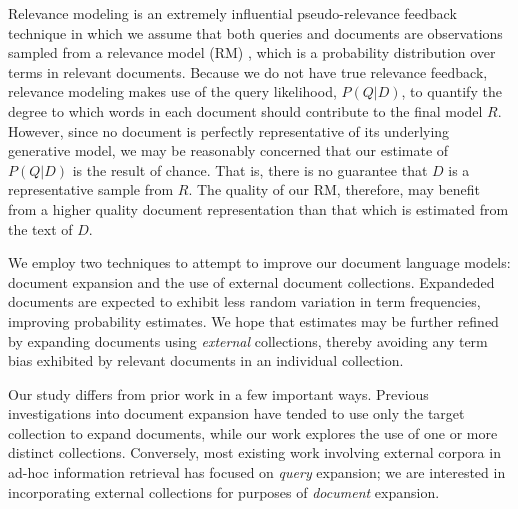 \documentclass[sigconf]{acmart}
\begin{document}
Relevance modeling is an extremely influential pseudo-relevance feedback technique in which we assume that both queries and documents are observations sampled from a relevance model (RM) \cite{Lavrenko2001}, which is a probability distribution over terms in relevant documents. Because we do not have true relevance feedback, relevance modeling makes use of the query likelihood, $P(Q|D)$, to quantify the degree to which words in each document should contribute to the final model $R$. However, since no document is perfectly representative of its underlying generative model, we may be reasonably concerned that our estimate of $P(Q|D)$ is the result of chance. That is, there is no guarantee that $D$ is a representative sample from $R$. The quality of our RM, therefore, may benefit from a higher quality document representation than that which is estimated from the text of $D$.

We employ two techniques to attempt to improve our document language models: document expansion and the use of external document collections. Expandeded documents are expected to exhibit less random variation in term frequencies, improving probability estimates. We hope that estimates may be further refined by expanding documents using \textit{external} collections, thereby avoiding any term bias exhibited by relevant documents in an individual collection.



Our study differs from prior work in a few important ways. Previous investigations into document expansion have tended to use only the target collection to expand documents, while our work explores the use of one or more distinct collections. Conversely, most existing work involving external corpora in ad-hoc information retrieval has focused on \textit{query} expansion; we are interested in incorporating external collections for purposes of \textit{document} expansion.
\end{document}
